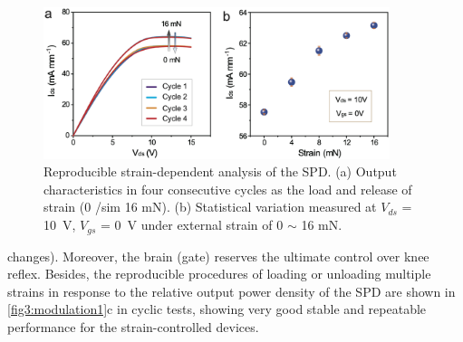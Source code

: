 \begin{figure}[H] 
\centering    
\includegraphics[width=0.9\textwidth]{ch3_modulation2}
\caption[Reproducible strain-dependent analysis of the SPD]{Reproducible strain-dependent analysis of the SPD. (a) Output characteristics in four consecutive cycles as the load and release of strain (0 /sim 16 \unit{mN}). (b) Statistical variation measured at $V_{ds}$ = \SI{10}{\volt}, $V_{gs}$ = \SI{0}{\volt} under external strain of 0 $\sim$ 16 \unit{mN}.}
\label{fig3:modulation2}
\end{figure}

\noindent changes). Moreover, the brain (gate) reserves the ultimate control over knee reflex. Besides, the reproducible procedures of loading or unloading multiple strains in response to the relative output power density of the SPD  are shown in \autoref{fig3:modulation1}c in cyclic tests, showing very good stable and repeatable performance for the strain-controlled devices.

